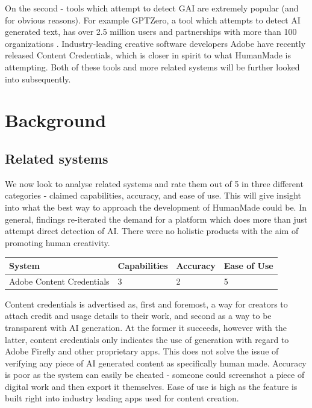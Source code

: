 \documentclass[12pt,a4paper]{article}
\begin{document}
\noindent On the second - tools which attempt to detect GAI are extremely popular (and for obvious reasons). For example GPTZero, a tool which attempts to detect AI generated text, has over 2.5 million users and partnerships with more than 100 organizations \cite{gptzero}. Industry-leading creative software developers Adobe have recently released Content Credentials, which is closer in spirit to what HumanMade is attempting. Both of these tools and more related systems will be further looked into subsequently.
\section{Background}
\subsection{Related systems}
We now look to analyse related systems and rate them out of 5 in three different categories - claimed capabilities, accuracy, and ease of use. This will give insight into what the best way to approach the development of HumanMade could be. In general, findings re-iterated the demand for a platform which does more than just attempt direct detection of AI. There were no holistic products with the aim of promoting human creativity.
\begin{table}[h]
    \centering
    \begin{tabular}{|M{3cm}|M{3cm}|M{3cm}|M{3cm}|}
    \hline
    System & Capabilities & Accuracy & Ease of Use \\ \hline 
    Adobe Content Credentials & 3 & 2 & 5\\
                           
\end{tabular}
\end{table}

\noindent Content credentials \cite{adobe} is advertised as, first and foremost, a way for creators to attach credit and usage details to their work, and second as a way to be transparent with AI generation. At the former it succeeds, however with the latter, content credentials only indicates the use of generation with regard to Adobe Firefly and other proprietary apps. This does not solve the issue of verifying any piece of AI generated content as specifically human made. Accuracy is poor as the system can easily be cheated - someone could screenshot a piece of digital work and then export it themselves. Ease of use is high as the feature is built right into industry leading apps used for content creation.
\end{document}
